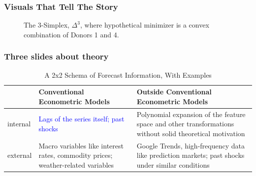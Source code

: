 \documentclass[9pt]{beamer}
\theoremstyle{definition}
\begin{document}
\begin{frame}\frametitle{Visuals That Tell The Story}

\begin{figure}
    \centering
    \caption{The 3-Simplex, $\Delta^{3}$, where hypothetical minimizer is a convex combination of Donors 1 and 4.}
    \end{figure}
    
\end{frame}

\begin{frame}\frametitle{Three slides about theory}
   
    \begin{table}[htb]
        \centering %
        \caption{A 2x2 Schema of Forecast Information, With Examples}
        \begin{tabular}{ | p{1cm} | p{4.8cm}| p{4.8cm} | } 
          \hline
          & Conventional Econometric Models & Outside Conventional Econometric Models\\ 
          \hline
          internal & \textcolor{blue}{Lags of the series itself; past shocks}  & Polynomial expansion of the feature space and other transformations without solid theoretical motivation \\
          \hline
          external & Macro variables like interest rates, commodity prices; weather-related variables & Google Trends, high-frequency data like prediction markets; past shocks under similar conditions \\ 
          \hline
        \end{tabular}
      \end{table}
\end{frame}
\end{document}
